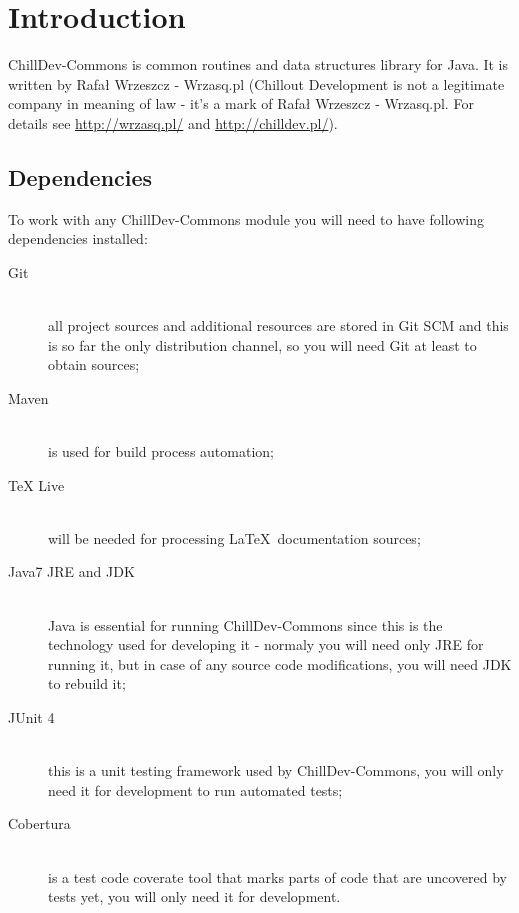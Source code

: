 %

\section{Introduction}

ChillDev-Commons is common routines and data structures library for Java. It is written by Rafał Wrzeszcz - Wrzasq.pl (Chillout Development is not a legitimate company in meaning of law - it's a mark of Rafał Wrzeszcz - Wrzasq.pl. For details see \url{http://wrzasq.pl/} and \url{http://chilldev.pl/}).

\subsection{Dependencies}

To work with any ChillDev-Commons module you will need to have following dependencies installed:

\begin{description}
    \item[Git] \hfill \\
    all project sources and additional resources are stored in Git SCM and this is so far the only distribution channel, so you will need Git at least to obtain sources;

    \item[Maven] \hfill \\
    is used for build process automation;

    \item[TeX Live] \hfill \\
    will be needed for processing \LaTeX\ documentation sources;

    \item[Java7 JRE and JDK] \hfill \\
    Java is essential for running ChillDev-Commons since this is the technology used for developing it - normaly you will need only JRE for running it, but in case of any source code modifications, you will need JDK to rebuild it;

    \item[JUnit 4] \hfill \\
    this is a unit testing framework used by ChillDev-Commons, you will only need it for development to run automated tests;

    \item[Cobertura] \hfill \\
    is a test code coverate tool that marks parts of code that are uncovered by tests yet, you will only need it for development.
\end{description}

